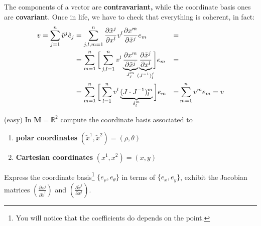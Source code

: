 \documentclass[../main.tex]{subfiles}
\begin{document}
The components of a vector are \textbf{contravariant,} while the coordinate basis ones are \textbf{covariant}. Once in life, we have to check that everything is coherent, in fact:
\begin{align*}
    v =\sum_{j=1}^n\tilde{v}^j\tilde{e}_j
    &=\sum_{j,l,m=1}^n\frac{\partial\tilde{x}^j}{\partial x^l}v^l\frac{\partial x^m}{\partial \tilde{x}^j}e_m &=&\\
    &=\sum_{m=1}^n\bigg[\sum_{j,l=1}^n v^l\underbrace{\frac{\partial x^m}{\partial\tilde{x}^j}}_{\mathclap{J_j^m}}\underbrace{\frac{\partial\tilde{x}^j}{\partial x^l}}_{\mathclap{(J^{-1})_l^j}}\bigg]e_m &=&\\
    &=\sum_{m=1}^n \bigg[\sum_{l=1}^n v^l \underbrace{(J \cdot J^{-1})_l^m}_{\mathclap{\delta_l^m}}\bigg]e_m &=&\sum_{m=1}^n v^m e_m=v
\end{align*}
\begin{example}(easy)
In $\mathbf{M}=\mathbb{R}^2$ compute the coordinate basis associated to
\begin{enumerate}
    \item \textbf{polar coordinates} $(\tilde{x}^1,\tilde{x}^2)=(\rho,\theta)$
    \item \textbf{Cartesian coordinates} $(x^1,x^2)=(x,y)$
\end{enumerate}
Express the coordinate basis\footnote{You will notice that the coefficients do depends on the point.} $\{e_{\rho},e_{\theta}\}$ in terms of $\{e_x,e_y\}$, exhibit the Jacobian matrices $\left(\frac{\partial x^j}{\partial\tilde{x}^l}\right)$ and $\left(\frac{\partial\tilde{x}^j}{\partial x^l}\right)$.
\end{example}
\end{document}
